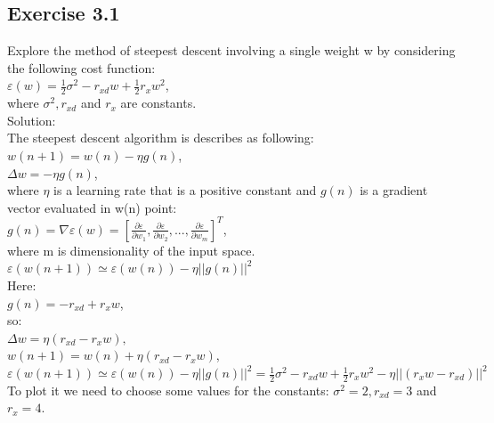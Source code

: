 \documentclass[a4paper, 12pt]{article}
\begin{document}
\subsection{Exercise 3.1}
Explore the method of steepest descent involving a single weight w by considering the following cost function:\\

$\varepsilon(w) = \frac{1}{2} \sigma^2 - r_{xd}w + \frac{1}{2}r_x w^2$,\\

where $\sigma^2, r_{xd}$ and $r_x$ are constants.\\

Solution:\\

The steepest descent algorithm is describes as following:\\

$w(n+1) = w(n) - \eta g(n)$,\\
$\Delta w = -\eta g(n)$,\\

where $\eta$ is a learning rate that is a positive constant and $g(n)$ is a gradient vector evaluated in w(n) point:\\

$g(n) = \nabla \varepsilon(w) = [\frac{\partial \varepsilon}{\partial w_1}, \frac{\partial \varepsilon}{\partial w_2}, ... , \frac{\partial \varepsilon}{\partial w_m}]^T$, \\

where m is dimensionality of the input space.\\

$\varepsilon(w(n + 1)) \simeq \varepsilon(w(n)) - \eta ||g(n)||^2$\\

Here:\\

$g(n) = -r_{xd} + r_x w $, \\

so: \\

$\Delta w = \eta (r_{xd} - r_x w ),$\\

$w(n+1) = w(n) + \eta (r_{xd} - r_x w )$,\\

$\varepsilon(w(n + 1)) \simeq \varepsilon(w(n)) - \eta ||g(n)||^2 = \frac{1}{2} \sigma^2 - r_{xd}w + \frac{1}{2}r_x w^2 - \eta ||(r_x w - r_{xd})||^2$\\

To plot it we need to choose some values for the constants:  $\sigma^2 = 2, r_{xd} = 3$ and $r_x = 4$.\\
\end{document}
